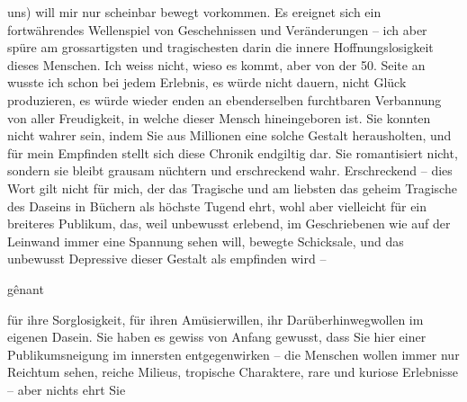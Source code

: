                uns) will mir nur scheinbar \introOben{}\introOben{}bewegt vorkommen. Es ereignet sich ein fortwährendes Wellenspiel von
               Geschehnissen und Veränderungen – ich aber spüre am grossartigsten und tragischesten darin die innere Hoffnungslosigkeit dieses
               Menschen. Ich weiss nicht, wieso es kommt, aber von der 50. Seite an wusste ich schon
               bei jedem Erlebnis, es würde nicht dauern, nicht Glück produzieren, es würde wieder
               enden an ebenderselben {\pb}furchtbaren
               Verbannung von aller Freudigkeit, in welche dieser Mensch hineingeboren ist. Sie
               konnten nicht wahrer sein, indem Sie aus Millionen eine solche Gestalt herausholten,
               und für mein Empfinden stellt sich diese Chronik endgiltig dar. Sie romantisiert
               nicht, sondern sie bleibt grausam nüchtern und erschreckend wahr. Erschreckend – dies
               Wort gilt nicht für mich, der das Tragische und am liebsten das geheim Tragische des
               Daseins in Büchern als höchste Tugend ehrt, wohl aber vielleicht für ein breiteres
               Publikum, das, weil \label{T_L03689-1v}\label{T_L03689-1} unbewusst erlebend, im Geschriebenen wie
               auf der Leinwand immer eine Spannung sehen will, bewegte Schicksale, und das
               unbewusst Depressive dieser Gestalt als \label{K_L03689-3v}\label{K_L03689-3} empfinden wird – \begin{otherlanguage}{french}gênant\end{otherlanguage} für ihre
               Sorglosigkeit, für ihren Amüsierwillen, ihr Darüberhinwegwollen im eigenen Dasein.
               Sie haben es gewiss von Anfang gewusst, dass Sie hier einer Publikumsneigung im
               innersten entgegenwirken – die Menschen wollen immer nur Reichtum sehen, reiche
               Milieus, tropische Charaktere, rare und kuriose Erlebnisse – aber nichts ehrt Sie
